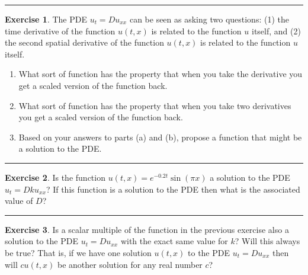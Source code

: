 \documentclass[
]{book}
\providecommand{\tightlist}{%
  \setlength{\itemsep}{0pt}\setlength{\parskip}{0pt}}
\theoremstyle{definition}
\theoremstyle{definition}
\theoremstyle{definition}
\newtheorem{exercise}{Exercise}[chapter]
\theoremstyle{remark}
\begin{document}
\begin{center}\rule{0.5\linewidth}{0.5pt}\end{center}

\begin{exercise}
\protect\hypertarget{exr:unnamed-chunk-514}{}{\label{exr:unnamed-chunk-514} }The PDE \(u_t = D u_{xx}\) can be seen as asking two questions: (1) the time derivative of the function \(u(t,x)\) is related to the function \(u\) itself, and (2) the second spatial derivative of the function \(u(t,x)\) is related to the function \(u\) itself.

\begin{enumerate}
\def\labelenumi{\alph{enumi}.}
\tightlist
\item
  What sort of function has the property that when you take the derivative you get a scaled version of the function back.
\item
  What sort of function has the property that when you take two derivatives you get a scaled version of the function back.
\item
  Based on your answers to parts (a) and (b), propose a function that might be a solution to the PDE.
\end{enumerate}
\end{exercise}

\begin{center}\rule{0.5\linewidth}{0.5pt}\end{center}

\begin{exercise}
\protect\hypertarget{exr:unnamed-chunk-515}{}{\label{exr:unnamed-chunk-515} }Is the function \(u(t,x) = e^{-0.2t} \sin(\pi x)\) a solution to the PDE \(u_t =Dk u_{xx}\)? If this function is a solution to the PDE then what is the associated value of \(D\)?
\end{exercise}

\begin{center}\rule{0.5\linewidth}{0.5pt}\end{center}

\begin{exercise}
\protect\hypertarget{exr:unnamed-chunk-516}{}{\label{exr:unnamed-chunk-516} }Is a scalar multiple of the function in the previous exercise also a solution to the PDE \(u_t = D u_{xx}\) with the exact same value for \(k\)? Will this always be true? That is, if we have one solution \(u(t,x)\) to the PDE \(u_t = D u_{xx}\) then will \(c u(t,x)\) be another solution for any real number \(c\)?
\end{exercise}
\end{document}
